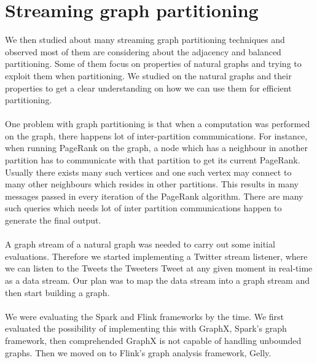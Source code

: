 \documentclass[12pt]{report}
\numberwithin{figure}{section}
\numberwithin{table}{section}
\begin{document}
\section{Streaming graph partitioning}
We then studied about many streaming graph partitioning techniques and observed most of them are considering about the adjacency and balanced partitioning. Some of them focus on properties of natural graphs and trying to exploit them when partitioning. We studied on the natural graphs and their properties to get a clear understanding on how we can use them for efficient partitioning. 

\paragraph{}

One problem with graph partitioning  is that when a computation was performed on the graph, there happens lot of inter-partition communications. For instance, when running PageRank on the graph, a node which has a neighbour in another partition has to communicate with that partition to get its current PageRank. Usually there exists many such vertices and one such vertex may connect to many other neighbours which resides in other partitions. This results in many messages passed in every iteration of the PageRank algorithm. There are many such queries which needs lot of inter partition communications happen to generate the final output.

\paragraph{}

A graph stream of a natural graph was needed to carry out some initial evaluations. Therefore we started implementing a Twitter stream listener, where we can listen to the Tweets the Tweeters Tweet at any given moment in real-time as a data stream. Our plan was to map the data stream into a graph stream and then start building a graph. 

\paragraph{}

We were evaluating the Spark and Flink frameworks by the time. We first evaluated the possibility of implementing this with GraphX, Spark’s graph framework, then comprehended GraphX is not capable of handling unbounded graphs. Then we moved on to Flink’s graph analysis framework, Gelly. 
\end{document}
